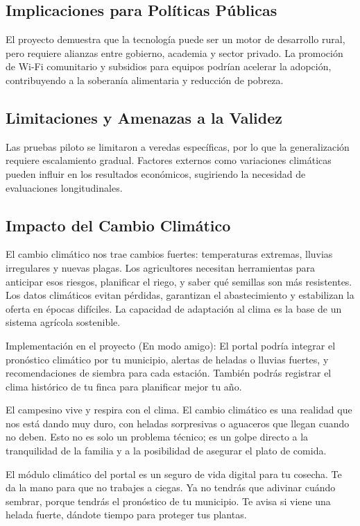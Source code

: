 \subsection{Implicaciones para Políticas Públicas}
El proyecto demuestra que la tecnología puede ser un motor de desarrollo rural, pero requiere alianzas entre gobierno, academia y sector privado. La promoción de Wi-Fi comunitario y subsidios para equipos podrían acelerar la adopción, contribuyendo a la soberanía alimentaria y reducción de pobreza.

\subsection{Limitaciones y Amenazas a la Validez}
Las pruebas piloto se limitaron a veredas específicas, por lo que la generalización requiere escalamiento gradual. Factores externos como variaciones climáticas pueden influir en los resultados económicos, sugiriendo la necesidad de evaluaciones longitudinales.

\subsection{Impacto del Cambio Climático}
El cambio climático nos trae cambios fuertes: temperaturas extremas, lluvias irregulares y nuevas plagas. Los agricultores necesitan herramientas para anticipar esos riesgos, planificar el riego, y saber qué semillas son más resistentes. Los datos climáticos evitan pérdidas, garantizan el abastecimiento y estabilizan la oferta en épocas difíciles. La capacidad de adaptación al clima es la base de un sistema agrícola sostenible.

Implementación en el proyecto (En modo amigo): El portal podría integrar el pronóstico climático por tu municipio, alertas de heladas o lluvias fuertes, y recomendaciones de siembra para cada estación. También podrás registrar el clima histórico de tu finca para planificar mejor tu año.

El campesino vive y respira con el clima. El cambio climático es una realidad que nos está dando muy duro, con heladas sorpresivas o aguaceros que llegan cuando no deben. Esto no es solo un problema técnico; es un golpe directo a la tranquilidad de la familia y a la posibilidad de asegurar el plato de comida.

El módulo climático del portal es un seguro de vida digital para tu cosecha. Te da la mano para que no trabajes a ciegas. Ya no tendrás que adivinar cuándo sembrar, porque tendrás el pronóstico de tu municipio. Te avisa si viene una helada fuerte, dándote tiempo para proteger tus plantas.

